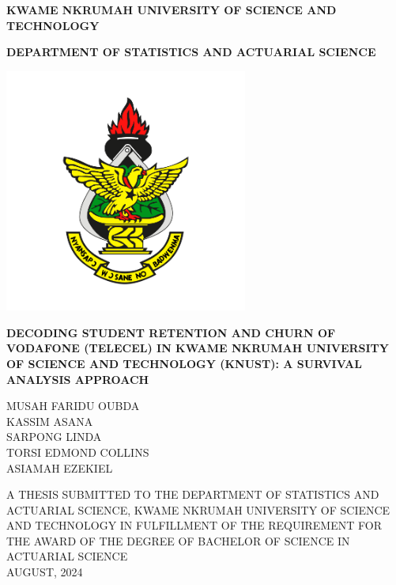 \documentclass[doublespacing,12pt]{report}
\begin{document}
\begin{singlespace} %
\begin{titlepage}
\centering
    \large\textbf{KWAME NKRUMAH UNIVERSITY OF SCIENCE AND TECHNOLOGY}

      \vspace{0.2cm}
  \large\textbf{DEPARTMENT OF STATISTICS AND ACTUARIAL SCIENCE}
    
     \begin{center}
\includegraphics[width=0.6\textwidth]{logo.png}\end{center}

   \large{\textbf{\MakeUppercase{Decoding Student Retention and Churn of Vodafone (Telecel) in Kwame Nkrumah University of Science and Technology (KNUST): A Survival Analysis Approach}}}
\vspace{0.4cm}
   \\
    \vspace{0.4cm}
    
\large{MUSAH FARIDU OUBDA\\
KASSIM ASANA\\
SARPONG LINDA\\
TORSI EDMOND COLLINS\\
ASIAMAH EZEKIEL}

    \vspace{1cm}  
    \small{A THESIS SUBMITTED TO THE DEPARTMENT OF STATISTICS AND ACTUARIAL SCIENCE, KWAME NKRUMAH UNIVERSITY OF SCIENCE AND TECHNOLOGY IN FULFILLMENT OF THE REQUIREMENT FOR THE AWARD OF THE DEGREE OF BACHELOR OF SCIENCE IN ACTUARIAL SCIENCE}\\
    \vspace{0.4cm}
    {AUGUST, 2024}
\end{titlepage}
\end{singlespace} %
\end{document}
